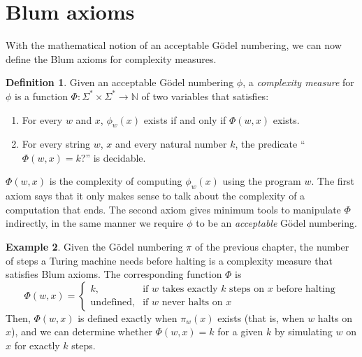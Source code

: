 \documentclass[12pt]{article}
\theoremstyle{definition}
\newtheorem{definition}{Definition}
\newtheorem{example}[definition]{Example}
\begin{document}
\section{Blum axioms}
\label{sec:blum-axioms}

With the mathematical notion of an acceptable Gödel numbering,
we can now define the Blum axioms for complexity measures.

\begin{definition}
    Given an acceptable Gödel numbering $\phi$,
    a \emph{complexity measure} for $\phi$
    is a function $\Phi:\Sigma^* \times \Sigma^* \to \mathbb N$ of two variables
    that satisfies: \cite[p.~324]{Blum1967}
    \begin{enumerate}
        \item For every $w$ and $x$,
            $\phi_w(x)$ exists if and only if $\Phi(w, x)$ exists.
        \item For every string $w$, $x$ and every natural number $k$,
            the predicate ``$\Phi(w, x) = k$?'' is decidable.
    \end{enumerate}
\end{definition}

$\Phi(w, x)$ is the complexity of computing $\phi_w(x)$
using the program $w$.
The first axiom says that it only makes sense
to talk about the complexity of a computation that ends.
The second axiom gives minimum tools to manipulate $\Phi$ indirectly,
in the same manner we require $\phi$ to be an \emph{acceptable} Gödel numbering.

\begin{example}
    Given the Gödel numbering $\pi$ of the previous chapter,
    the number of steps a Turing machine needs before halting
    is a complexity measure that satisfies Blum axioms.
    The corresponding function $\Phi$ is
    \begin{equation*}
        \Phi(w, x) = \begin{cases}
            k, &\text{if $w$ takes exactly $k$ steps on $x$ before halting} \\
            \text{undefined}, &\text{if $w$ never halts on $x$}
        \end{cases}
    \end{equation*}
    Then, $\Phi(w, x)$ is defined exactly when $\pi_w(x)$ exists
    (that is, when $w$ halts on $x$),
    and we can determine whether $\Phi(w, x) = k$ for a given $k$
    by simulating $w$ on $x$ for exactly $k$ steps.
\end{example}
\end{document}
